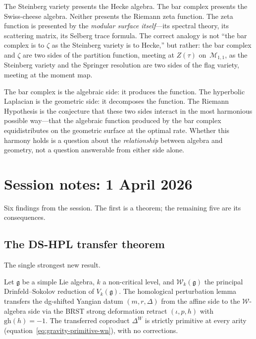 \documentclass[11pt]{article}
\newcommand{\cM}{\mathcal{M}}
\newcommand{\cW}{\mathcal{W}}
\newcommand{\fg}{\mathfrak{g}}
\begin{document}
The Steinberg variety presents the Hecke algebra.  The bar
complex presents the Swiss-cheese algebra.  Neither presents
the Riemann zeta function.  The zeta function is presented
by the \emph{modular surface itself}---its spectral theory,
its scattering matrix, its Selberg trace formula.  The
correct analogy is not ``the bar complex is to $\zeta$ as the
Steinberg variety is to Hecke,'' but rather: the bar complex
and $\zeta$ are two sides of the partition function, meeting
at $Z(\tau)$ on~$\cM_{1,1}$, as the Steinberg variety and the
Springer resolution are two sides of the flag variety, meeting
at the moment map.

The bar complex is the algebraic side: it produces the
function.  The hyperbolic Laplacian is the geometric side: it
decomposes the function.  The Riemann Hypothesis is the
conjecture that these two sides interact in the most
harmonious possible way---that the algebraic function
produced by the bar complex equidistributes on the geometric
surface at the optimal rate.  Whether this harmony holds is a
question about the \emph{relationship} between algebra and
geometry, not a question answerable from either side alone.


\section{Session notes: 1 April 2026}
\label{sec:session-2026-04-01}

Six findings from the session.  The first is a theorem; the
remaining five are its consequences.


\subsection{The DS-HPL transfer theorem}
\label{sec:ds-hpl-transfer}

The single strongest new result.

\begin{theorem}
\label{thm:ds-hpl-transfer-wn}
Let $\fg$ be a simple Lie algebra, $k$ a non-critical level, and
$\cW_k(\fg)$ the principal Drinfeld--Sokolov reduction of
$V_k(\fg)$.  The homological perturbation lemma transfers the
dg-shifted Yangian datum $(m, r, \Delta)$ from the affine side to
the $\cW$-algebra side via the BRST strong deformation retract
$(\iota, p, h)$ with $\mathrm{gh}(h) = -1$.  The transferred
coproduct $\Delta^W$ is strictly primitive at every arity
(equation~\eqref{eq:gravity-primitive-wn}), with no corrections.
\end{theorem}
\end{document}
